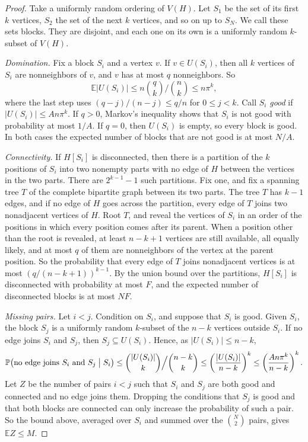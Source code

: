 \documentclass[11pt]{article}
\newcommand{\E}{\mathbb E}
\newcommand{\Prb}{\mathbb P}
\begin{document}
\begin{proof}
Take a uniformly random ordering of $V(H)$. Let $S_1$ be the set of its first
$k$ vertices, $S_2$ the set of the next $k$ vertices, and so on up to $S_N$.
We call these sets blocks. They are disjoint, and each one on its own is a
uniformly random $k$-subset of $V(H)$.

\emph{Domination.} Fix a block $S_i$ and a vertex $v$. If $v\in U(S_i)$,
then all $k$ vertices of $S_i$ are nonneighbors of $v$, and $v$ has at most
$q$ nonneighbors. So
\begin{equation*}
 \E|U(S_i)|\le n\binom qk\Big/\binom nk\le n\pi^k,
\end{equation*}
where the last step uses $(q-j)/(n-j)\le q/n$ for $0\le j<k$. Call $S_i$
\emph{good} if $|U(S_i)|\le An\pi^k$. If $q>0$, Markov's inequality shows
that $S_i$ is not good with probability at most $1/A$. If $q=0$, then
$U(S_i)$ is empty, so every block is good. In both cases the expected number
of blocks that are not good is at most $N/A$.

\emph{Connectivity.} If $H[S_i]$ is disconnected, then there is a partition
of the $k$ positions of $S_i$ into two nonempty parts with no edge of $H$
between the vertices in the two parts. There are $2^{k-1}-1$ such
partitions. Fix one, and fix a spanning tree $T$ of the complete bipartite
graph between its two parts. The tree $T$ has $k-1$ edges, and if no edge of
$H$ goes across the partition, every edge of $T$ joins two nonadjacent
vertices of $H$. Root $T$, and reveal the vertices of $S_i$ in an order of
the positions in which every position comes after its parent. When a
position other than the root is revealed, at least $n-k+1$ vertices are still
available, all equally likely, and at most $q$ of them are nonneighbors of
the vertex at the parent position. So the probability that every edge of $T$
joins nonadjacent vertices is at most $(q/(n-k+1))^{k-1}$. By the union bound
over the partitions, $H[S_i]$ is disconnected with probability at most $F$,
and the expected number of disconnected blocks is at most $NF$.

\emph{Missing pairs.} Let $i<j$. Condition on $S_i$, and suppose that $S_i$
is good. Given $S_i$, the block $S_j$ is a uniformly random $k$-subset of the
$n-k$ vertices outside $S_i$. If no edge joins $S_i$ and $S_j$, then
$S_j\subseteq U(S_i)$. Hence, as $|U(S_i)|\le n-k$,
\begin{equation*}
 \Prb\bigl(\text{no edge joins }S_i\text{ and }S_j\bigm|S_i\bigr)
 \le\binom{|U(S_i)|}{k}\Big/\binom{n-k}{k}
 \le\left(\frac{|U(S_i)|}{n-k}\right)^k
 \le\left(\frac{An\pi^k}{n-k}\right)^k.
\end{equation*}
Let $Z$ be the number of pairs $i<j$ such that $S_i$ and $S_j$ are both good
and connected and no edge joins them. Dropping the conditions that $S_j$ is
good and that both blocks are connected can only increase the probability of
such a pair. So the bound above, averaged over $S_i$ and summed over the
$\binom N2$ pairs, gives $\E Z\le M$.


\end{proof}
\end{document}
